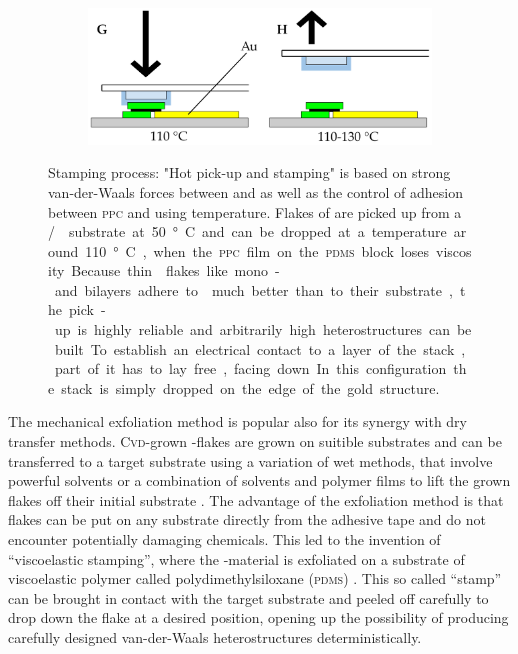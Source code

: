 \begin{figure}[t]
\begin{subfigure}{0.49\textwidth}
\end{subfigure}
\begin{subfigure}{0.49\textwidth}
	\includegraphics[width=\textwidth]{stamp_gh}
\end{subfigure}
\caption{Stamping process: "Hot pick-up and stamping" is based on strong van-der-Waals forces between \hbng and \tmds as well as the control of adhesion between \textsc{ppc} and \hbng using temperature. Flakes of \hbng are picked up from a \si/\sio substrate at 50 °C and can be dropped at a temperature around 110 °C, when the \textsc{ppc} film on the \textsc{pdms} block loses viscosity. Because thin \tmdg flakes like mono- and bilayers adhere to \hbng much better than to their substrate, the pick-up is highly reliable and arbitrarily high heterostructures can be built. To establish an electrical contact to a layer of the stack, part of it has to lay free, facing down. In this configuration the stack is simply dropped on the edge of the gold structure.}
	\label{stamping}
\end{figure}

The mechanical exfoliation method is popular also for its synergy with dry transfer methods. \textsc{Cvd}-grown \tmd-flakes are grown on suitible substrates and can be transferred to  a target substrate using a variation of wet methods, that involve powerful solvents or a combination of solvents and polymer films to lift the grown flakes off their initial substrate  \cite{li_universal_2014}. The advantage of the exfoliation method is that flakes can be put on any substrate directly from the adhesive tape and do not encounter potentially damaging chemicals. This led to the invention of ``viscoelastic stamping'', where the \tmd-material is exfoliated on a substrate of viscoelastic polymer called polydimethylsiloxane (\textsc{pdms}) \cite{castellanos-gomez_deterministic_2014}. This so called ``stamp'' can be brought in contact with the target substrate and peeled off carefully to drop down the flake at a desired position, opening up the possibility of producing carefully designed van-der-Waals heterostructures deterministically.

